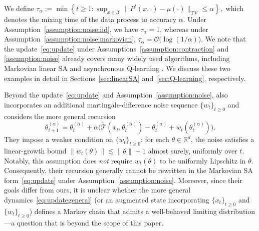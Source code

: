 \documentclass[11pt,letterpaper]{article}
\theoremstyle{plain}
\theoremstyle{definition}
\theoremstyle{remark}
\newcommand{\mT}{\mathcal{T}}
\newcommand{\R}{\mathbb{R}}
\newcommand{\tmT}{\widetilde{\mT}}
\begin{document}
We define $\tau_\alpha
    :=
    \min\left\{
        t\geq 1:
        \sup_{x\in\mathcal X}
        \bigl\|P^t(x,\cdot)-\mu(\cdot)\bigr\|_{\mathrm{TV}}
        \leq \alpha
    \right\},$ which denotes the mixing time of the data process to accuracy \(\alpha\).
Under Assumption~\ref{assumption:noise:iid}, we have \(\tau_\alpha=1\), 
whereas under Assumption~\ref{assumption:noise:markovian}, $\tau_\alpha=\mathcal{O}\bigl(\log(1/\alpha)\bigr).$ We  note that the update~\eqref{eq:update} under
Assumptions~\ref{assumption:contraction} and \ref{assumption:noise} already covers many widely used algorithms,
including Markovian linear SA \citep{huo2023bias} and asynchronous Q-learning
\citep{zhang2024constant}. We discuss these two examples in detail in
Sections~\ref{sec:linearSA} and~\ref{sec:Q-learning}, respectively.

Beyond the update~\eqref{eq:update} and Assumption~\ref{assumption:noise},
\cite{chen2024lyapunov} also incorporates an additional martingale-difference
noise sequence $\{w_t\}_{t\ge 0}$ and considers the more general recursion
\begin{equation}\label{eq:updategeneral}
\theta_{t+1}^{(\alpha)}
= \theta_t^{(\alpha)} + \alpha\big(\tmT(x_t,\theta_t^{(\alpha)}) - \theta_t^{(\alpha)} + w_t(\theta_t^{(\alpha)})\big).
\end{equation}
They impose a weaker condition on $\{w_t\}_{t\ge 0}$: for each
$\theta\in\R^d$, the noise satisfies a linear-growth bound $\|w_t(\theta)\|\lesssim\|\theta\|+1$ almost surely, uniformly over $t$. Notably, this assumption does \emph{not} require $w_t(\theta)$ to be uniformly Lipschitz
in $\theta$. Consequently, their recursion generally cannot be rewritten in the
Markovian SA form~\eqref{eq:update} under Assumption~\ref{assumption:noise}.
Moreover, since their goals differ from ours, it is unclear whether the more
general dynamics~\eqref{eq:updategeneral} (or an augmented state incorporating $\{x_t\}_{t \geq 0}$ and 
$\{w_t\}_{t \geq 0}$) defines a Markov chain that admits a well-behaved limiting
distribution---a question that is beyond the scope of this paper.
\end{document}
